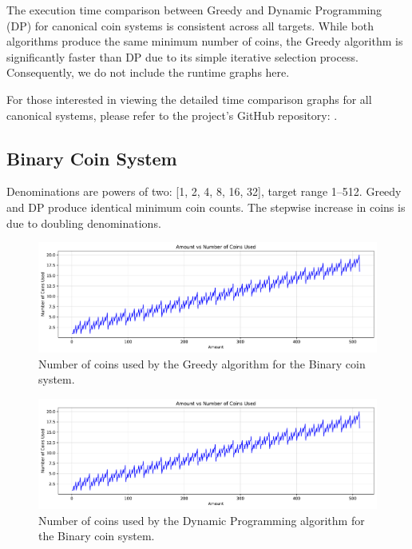 \documentclass[12pt,a4paper]{report}
\begin{document}
\begin{tcolorbox}[colback=gray!5!white, colframe=black, title=Execution Time Note]
The execution time comparison between Greedy and Dynamic Programming (DP) for canonical coin systems is consistent across all targets. While both algorithms produce the same minimum number of coins, the Greedy algorithm is significantly faster than DP due to its simple iterative selection process. Consequently, we do not include the runtime graphs here. 

For those interested in viewing the detailed time comparison graphs for all canonical systems, please refer to the project's GitHub repository: \url{}.
\end{tcolorbox}


\subsection{Binary Coin System}
Denominations are powers of two: [1, 2, 4, 8, 16, 32], target range 1--512. Greedy and DP produce identical minimum coin counts. The stepwise increase in coins is due to doubling denominations.

\begin{figure}[H]
  \centering
  \includegraphics[width=\textwidth]{graphs/greedy_coins_binary_plot.pdf}
  \caption{Number of coins used by the Greedy algorithm for the Binary coin system.}
  \label{fig:greedy_coins_binary}
\end{figure}

\begin{figure}[H]
  \centering
  \includegraphics[width=\textwidth]{graphs/dp_coins_binary_plot.pdf}
  \caption{Number of coins used by the Dynamic Programming algorithm for the Binary coin system.}
  \label{fig:dp_coins_binary}
\end{figure}
\end{document}
